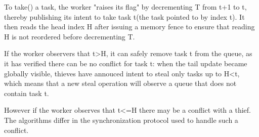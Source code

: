 \documentclass[a4paper]{article}
\begin{document}
To take() a task, the worker "raises its flag" by decrementing T from t+1 to t, thereby publishing its intent to take task t(the task pointed to by index t). It then reads the head index H after issuing a memory fence to ensure that reading H is not reordered before decrementing T.

If the worker observers that t>H, it can safely remove task t from the queue, as it has verified there can be no conflict for task t: when the tail update became globally visible, thieves have annouced intent to steal only tasks up to H<t, which means that a new steal operation will observe a queue that does not contain task t.

However if the worker observes that t<=H there may be a conflict with a thief. The algorithms differ in the synchronization protocol used to handle such a conflict.
\end{document}
